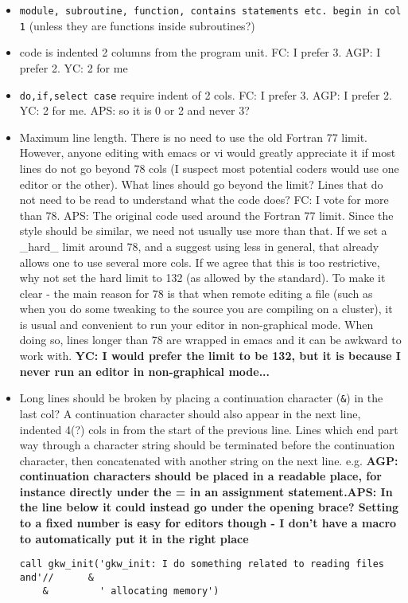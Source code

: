 \documentclass[12pt,twoside,notitlepage,a4paper]{article}
\newcommand{\code}[1]{\texttt{#1}}
\begin{document}
\begin{itemize}
\item \code{module, subroutine, function, contains statements etc. begin in col 1} 
(unless they are functions inside subroutines?)
\item code is indented 2 columns from the program unit.  FC: I prefer 3. AGP: I prefer 2. YC: 2 for me 
\item \code{do,if,select case} require indent of 2 cols.  FC: I prefer 3. AGP: I prefer 2. YC: 2 for me. APS: so it is 0 or 2 and never 3?
\item Maximum line length. There is no need to use the old Fortran 77 limit. However, anyone
editing with emacs or vi would greatly appreciate it if most lines do not go beyond 78 cols
(I suspect most potential coders would use one editor or the other). What lines should go beyond the
limit? Lines that do not need to be read to understand what the code does? FC: I vote for more than 78.
APS: The original code used around the Fortran 77 limit. Since the style should be similar, we need not
usually use more than that. If we set a _hard_ limit around 78, and a suggest using less in general, that
already allows one to use several more cols. If we agree that this is too restrictive, why not set the hard
limit to 132 (as allowed by the standard). To make it clear - the main reason for 78 is that when remote
editing a file (such as when you do some tweaking to the source you are compiling on a cluster), it is usual
and convenient to run your editor in non-graphical mode. When doing so, lines longer than 78 are wrapped in
emacs and it can be awkward to work with. \textbf{YC: I would prefer the limit to be 132, but it is because I never run an editor in non-graphical mode...}
\item Long lines should be broken by placing a continuation character (\code{\&}) in the last col?
A continuation character should also appear in the next line, indented 4(?) cols in from the start
of the previous line. Lines which end part way through a character string should be terminated before
the continuation character, then concatenated with another string on the next line.
e.g. {\bf AGP: continuation characters should be placed in a readable place, for instance directly 
under the = in an assignment statement.APS: In the line below it could instead go under the opening brace?
Setting to a fixed number is easy for editors though - I don't have a macro to
automatically put it in the right place}
\begin{Verbatim}
call gkw_init('gkw_init: I do something related to reading files and'//      &
    &         ' allocating memory')
\end{Verbatim}
\end{itemize}
\end{document}
